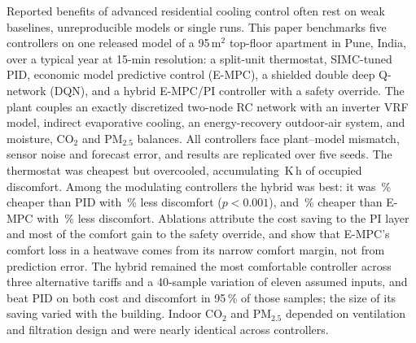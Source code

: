 Reported benefits of advanced residential cooling control often rest on weak baselines,
unreproducible models or single runs. This paper benchmarks five controllers on one
released model of a 95\,m$^2$ top-floor apartment in Pune, India, over a
typical year at 15-min resolution: a split-unit thermostat, SIMC-tuned PID, economic
model predictive control (E-MPC), a shielded double deep Q-network (DQN), and a hybrid
E-MPC/PI controller with a safety override. The plant couples an exactly discretized
two-node RC network with an inverter VRF model, indirect evaporative cooling, an
energy-recovery outdoor-air system, and moisture, CO$_2$ and PM$_{2.5}$ balances. All
controllers face plant--model mismatch, sensor noise and forecast error, and results are
replicated over five seeds. The thermostat was cheapest but overcooled, accumulating
\KhTh\,K\,h of occupied discomfort. Among the modulating controllers the hybrid was best: it was \RelHybPidCost\,\% cheaper than PID with \RelHybPidKh\,\% less
discomfort ($p<0.001$), and \RelHybMpcCost\,\% cheaper than E-MPC with \RelHybMpcKh\,\%
less discomfort. Ablations attribute the cost saving to the PI layer and most of the
comfort gain to the safety override, and show that E-MPC's comfort loss in a heatwave comes from its
narrow comfort margin, not from prediction error. The hybrid remained the most comfortable controller across three alternative
tariffs and a 40-sample variation of eleven assumed inputs, and beat PID on
both cost and discomfort in 95\,\% of those samples; the size of its saving varied
with the building. Indoor CO$_2$ and PM$_{2.5}$ depended on ventilation and
filtration design and were nearly identical across controllers.
